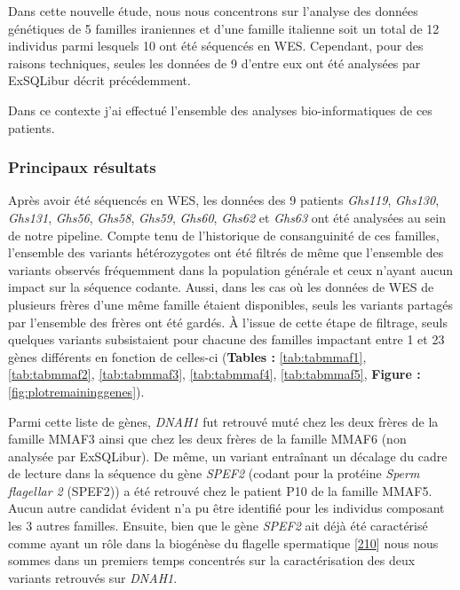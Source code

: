 \documentclass[12pt,a4paper,twoside]{ugathesis}
\theoremstyle{definition}
\theoremstyle{definition}
\theoremstyle{definition}
\theoremstyle{remark}
\begin{document}
Dans cette nouvelle étude, nous nous concentrons sur l'analyse des
données génétiques de 5 familles iraniennes et d'une famille italienne
soit un total de 12 individus parmi lesquels 10 ont été séquencés en
WES. Cependant, pour des raisons techniques, seules les données de 9
d'entre eux ont été analysées par ExSQLibur décrit précédemment.

Dans ce contexte j'ai effectué l'ensemble des analyses bio-informatiques
de ces patients.

\newpage



\newpage

\subsubsection{Principaux résultats}\label{principaux-resultats-2}

Après avoir été séquencés en WES, les données des 9 patients
\emph{Ghs119}, \emph{Ghs130}, \emph{Ghs131}, \emph{Ghs56}, \emph{Ghs58},
\emph{Ghs59}, \emph{Ghs60}, \emph{Ghs62} et \emph{Ghs63} ont été
analysées au sein de notre pipeline. Compte tenu de l'historique de
consanguinité de ces familles, l'ensemble des variants hétérozygotes ont
été filtrés de même que l'ensemble des variants observés fréquemment
dans la population générale et ceux n'ayant aucun impact sur la séquence
codante. Aussi, dans les cas où les données de WES de plusieurs frères
d'une même famille étaient disponibles, seuls les variants partagés par
l'ensemble des frères ont été gardés. À l'issue de cette étape de
filtrage, seuls quelques variants subsistaient pour chacune des familles
impactant entre 1 et 23 gènes différents en fonction de celles-ci
(\textbf{Tables :} \ref{tab:tabmmaf1}, \ref{tab:tabmmaf2},
\ref{tab:tabmmaf3}, \ref{tab:tabmmaf4}, \ref{tab:tabmmaf5},
\textbf{Figure : }\ref{fig:plotremaininggenes}).

Parmi cette liste de gènes, \emph{DNAH1} fut retrouvé muté chez les deux
frères de la famille MMAF3 ainsi que chez les deux frères de la famille
MMAF6 (non analysée par ExSQLibur). De même, un variant entraînant un
décalage du cadre de lecture dans la séquence du gène \emph{SPEF2}
(codant pour la protéine \emph{Sperm flagellar 2} (SPEF2)) a été
retrouvé chez le patient P10 de la famille MMAF5. Aucun autre candidat
évident n'a pu être identifié pour les individus composant les 3 autres
familles. Ensuite, bien que le gène \emph{SPEF2} ait déjà été
caractérisé comme ayant un rôle dans la biogénèse du flagelle
spermatique {[}\protect\hyperlink{ref-Lehti2017}{210}{]} nous nous
sommes dans un premiers temps concentrés sur la caractérisation des deux
variants retrouvés sur \emph{DNAH1}.
\end{document}
